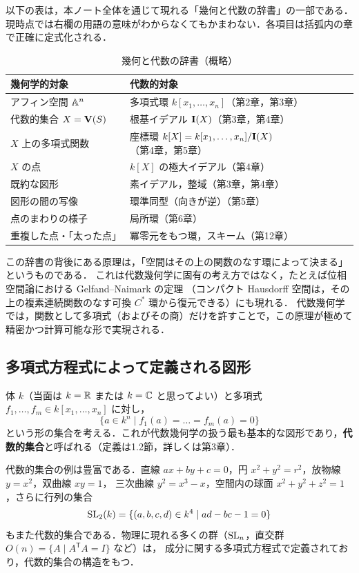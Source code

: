 以下の表は，本ノート全体を通じて現れる「幾何と代数の辞書」の一部である．
現時点では右欄の用語の意味がわからなくてもかまわない．各項目は括弧内の章で正確に定式化される．

\begin{table}[H]
\centering
\caption{幾何と代数の辞書（概略）}\label{tab:ch01-dictionary}
\begin{tabular}{ll}
\hline
幾何学的対象 & 代数的対象 \\
\hline
アフィン空間 $\mathbb{A}^n$ & 多項式環 $k[x_1,\dots,x_n]$（第2章，第3章）\\
代数的集合 $X=\mathbf{V}(S)$ & 根基イデアル $\mathbf{I}(X)$（第3章，第4章）\\
$X$ 上の多項式関数 & 座標環 $k[X]=k[x_1,\dots,x_n]/\mathbf{I}(X)$（第4章，第5章）\\
$X$ の点 & $k[X]$ の極大イデアル（第4章）\\
既約な図形 & 素イデアル，整域（第3章，第4章）\\
図形の間の写像 & 環準同型（向きが逆）（第5章）\\
点のまわりの様子 & 局所環（第6章）\\
重複した点・「太った点」 & 冪零元をもつ環，スキーム（第12章）\\
\hline
\end{tabular}
\end{table}

この辞書の背後にある原理は，「空間はその上の関数のなす環によって決まる」というものである．
これは代数幾何学に固有の考え方ではなく，たとえば位相空間論における Gelfand--Naimark の定理
（コンパクト Hausdorff 空間は，その上の複素連続関数のなす可換 $C^*$ 環から復元できる）にも現れる．
代数幾何学では，関数として多項式（およびその商）だけを許すことで，この原理が極めて精密かつ計算可能な形で実現される．

\subsection{多項式方程式によって定義される図形}

体 $k$（当面は $k=\mathbb{R}$ または $k=\mathbb{C}$ と思ってよい）と多項式 $f_1,\dots,f_m\in k[x_1,\dots,x_n]$ に対し，
\[
  \{a\in k^n \mid f_1(a)=\dots=f_m(a)=0\}
\]
という形の集合を考える．これが代数幾何学の扱う最も基本的な図形であり，\textbf{代数的集合}と呼ばれる（定義は1.2節，詳しくは第3章）．

代数的集合の例は豊富である．直線 $ax+by+c=0$，円 $x^2+y^2=r^2$，放物線 $y=x^2$，双曲線 $xy=1$，
三次曲線 $y^2=x^3-x$，空間内の球面 $x^2+y^2+z^2=1$，さらに行列の集合
\[
  \operatorname{SL}_2(k)=\{(a,b,c,d)\in k^4\mid ad-bc-1=0\}
\]
もまた代数的集合である．物理に現れる多くの群（$\operatorname{SL}_n$，直交群 $O(n)=\{A\mid A^{\mathsf T}A=I\}$ など）は，
成分に関する多項式方程式で定義されており，代数的集合の構造をもつ．


